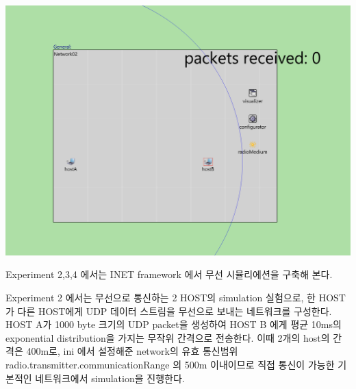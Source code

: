 \vspace{-3mm}
\section{}
\vspace{-4mm}
\begin{multicols}{2}
    \begin{minipage}{\columnwidth}
    \vspace{2mm}
    \centering%
    \includegraphics[width=.9\textwidth]{image/week12/2-1.png}
    \vspace{-2mm}
        \vspace{-4mm}
    \end{minipage}
    
    \columnbreak
    
    Experiment 2,3,4 에서는 INET framework 에서 무선 시뮬리에션을 구축해 본다.
    
    Experiment 2 에서는 무선으로 통신하는 2 HOST의 simulation 실험으로,  한 HOST가 다른 HOST에게 UDP 데이터 스트림을 무선으로 보내는 네트워크를  구성한다.
    HOST A가 1000 byte 크기의 UDP packet을 생성하여 HOST B 에게 평균 10ms의exponential distribution을 가지는 무작위 간격으로 전송한다.
    이때 2개의 host의 간격은 400m로, ini 에서 설정해준 network의 유효 통신범위radio.transmitter.communicationRange 의 500m 이내이므로 직접 통신이 가능한 기본적인 네트워크에서 simulation을 진행한다.
    \vspace{-4mm}
\end{multicols}
\vspace{-4mm}
\vspace{-4mm}

